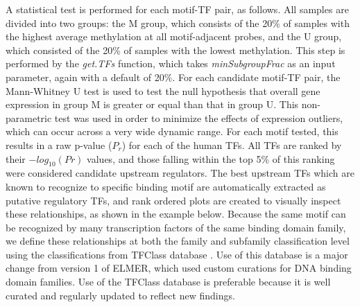 A statistical test is performed for each motif-TF pair, as follows. All samples 
are divided into two groups: the M group, which consists 
of the 20\% of samples with the highest average methylation at all motif-adjacent
probes, and the U group, which consisted of the 20\%  of samples with the lowest 
methylation. This step is performed by the \textit{get.TFs} function, which takes \textit{minSubgroupFrac} as an input parameter, again with a default of 20\%.
For each candidate motif-TF pair, the Mann-Whitney U test is used to test 
the null hypothesis that overall gene expression in group M is greater or equal 
than that in group U. This non-parametric test was used in order to minimize the 
effects of expression outliers, which can occur across a very wide dynamic range. 
For each motif tested, this results in a raw p-value ($P_r$) for each of the human TFs.
All TFs are ranked by their $-log_{10}(Pr)$ values, and those falling within the top 5\% of 
this ranking were considered candidate upstream regulators. The best upstream 
TFs which are known to recognize to specific binding motif are automatically extracted as putative 
regulatory TFs, and rank ordered plots are created to visually inspect these relationships, as shown in the example below. Because the same motif can be recognized by many transcription factors of the same binding domain family, we define these relationships at both the family and subfamily classification level using the 
classifications from TFClass database \cite{wingender2013tfclass}. Use of this database is a major change from version 1 of ELMER, which used custom curations for DNA binding domain families. Use of the TFClass database is preferable because it is well curated and regularly updated to reflect new findings.




